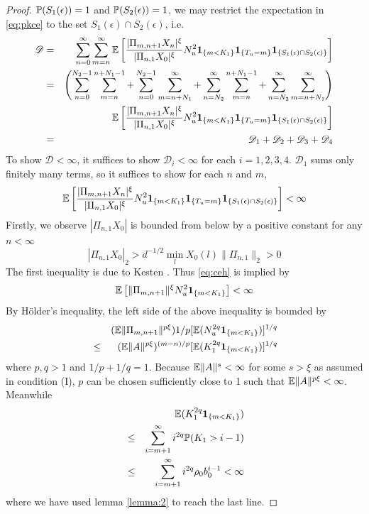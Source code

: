 \documentclass[aoas,preprint]{imsart}
\numberwithin{equation}{section}
\theoremstyle{plain}
\begin{document}
\begin{proof}
  $\P(S_1(\epsilon)) = 1$ and $\P(S_2(\epsilon)) = 1$, we may
  restrict the expectation in \eqref{eq:pkce} to the set
  $S_1(\epsilon) \cap S_2(\epsilon)$, i.e.
  \begin{eqnarray*}
    \mathscr D
    &=&
    \sum_{n = 0}^\infty \sum_{m = n}^\infty
    \E \left[
            {
        |\Pi_{m, n+1} X_n |^{\xi}
        \over
        |\Pi_{n, 1} X_0 |^{\xi}        
      }
      N_u^2
      \1{m < K_1} \1{T_u = m} \1{S_1(\epsilon) \cap S_2(\epsilon)} 
      \right] \\
    &=&
    \left(
    \sum_{n = 0}^{N_2 - 1} \sum_{m = n}^{n + N_1 - 1}
    +
    \sum_{n = 0}^{N_2 - 1} \sum_{m = n + N_1}^\infty
    +
    \sum_{n = N_2}^{\infty} \sum_{m = n}^{n + N_1 - 1}
    +
    \sum_{n = N_2}^{\infty} \sum_{m = n + N_1}^\infty
    \right) \nonumber \\
    &&
    \E \left[
            {
        |\Pi_{m, n+1} X_n |^{\xi}
        \over
        |\Pi_{n, 1} X_0 |^{\xi}        
      }
      N_u^2
      \1{m < K_1} \1{T_u = m} \1{S_1(\epsilon) \cap S_2(\epsilon)} 
      \right] \nonumber \\
    &=& \mathscr D_1 + \mathscr D_2 + \mathscr D_3 + \mathscr D_4
  \end{eqnarray*}
  To show $\mathscr D < \infty$, it suffices to show
  $\mathscr D_i < \infty$ for each $i = 1, 2, 3, 4$.
  $\mathscr D_1$ sums only finitely many terms, so it
  suffices to show for each $n$ and $m$,
  \begin{equation}
    \label{eq:ceh}
    \E \left[
      {
        |\Pi_{m, n+1} X_n |^{\xi}
        \over
        |\Pi_{n, 1} X_0 |^{\xi}        
      }
      N_u^2
      \1{m < K_1} \1{T_u = m} \1{S_1(\epsilon) \cap S_2(\epsilon)} 
      \right] < \infty
  \end{equation}
  Firstly, we observe $|\Pi_{n, 1} X_0 |$ is bounded from below by a positive
  constant for any $n < \infty$
  \[
  |\Pi_{n, 1} X_0|_2 > d^{-1/2} \min_l X_0(l) \|\Pi_{n,1}\|_2 > 0
  \]
  The first inequality is due to Kesten \cite{kesten:1973}.
  Thus \eqref{eq:ceh} is implied by
  \[
    \E \left[
        \|\Pi_{m, n+1}\|^{\xi}
      N_u^2
      \1{m < K_1}
      \right] < \infty
  \]
By H\"older's inequality, the left side of the above inequality is
bounded by
\begin{eqnarray*}
  &&
  (\E \|\Pi_{m, n+1}\|^{p \xi}){1/p}
  [\E (N_u^{2q} \1{m < K_1})]^{1/q} \\
  &\leq&
  (\E \|A\|^{p \xi})^{(m-n)/p}
  [\E (K_1^{2q} \1{m < K_1})]^{1/q}
\end{eqnarray*}
where $p,q>1$ and $1/p + 1/q = 1$.
Because $\E \|A\|^{s} < \infty$ for some $s > \xi$ as assumed in
condition (I), $p$ can be chosen sufficiently close to 1 such that
$\E \|A\|^{p \xi} < \infty$. Meanwhile
\begin{eqnarray*}
  &&
  \E (K_1^{2q} \1{m < K_1}) \\
  &\leq&
  \sum_{i=m+1}^\infty i^{2q} \P(K_1 > i - 1) \\
  &\leq&
  \sum_{i=m+1}^\infty i^{2q} \rho_0 b_0^{i-1} < \infty
\end{eqnarray*}
where we have used lemma \ref{lemma:2} to reach the
last line.


\end{proof}
\end{document}
